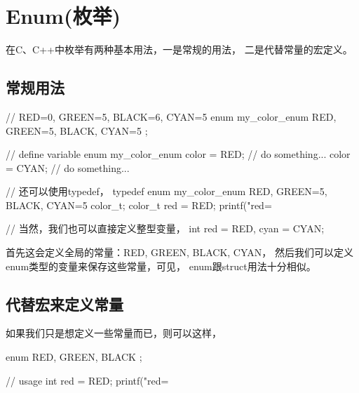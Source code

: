 ﻿\section[Enum]{Enum(枚举)}
在C、C++中枚举有两种基本用法，一是常规的用法，
二是代替常量的宏定义。
\subsection[常规用法]{常规用法}
\begin{cppcode}
// RED=0, GREEN=5, BLACK=6, CYAN=5
enum my_color_enum { RED, GREEN=5, BLACK, CYAN=5 };

// define variable
enum my_color_enum color = RED;
// do something...
color = CYAN;
// do something...

// 还可以使用typedef，
typedef enum my_color_enum {
  RED, GREEN=5, BLACK, CYAN=5
} color_t;
color_t red = RED;
printf("red=%

// 当然，我们也可以直接定义整型变量，
int red = RED, cyan = CYAN;
\end{cppcode}

首先这会定义全局的常量：RED, GREEN, BLACK, CYAN，
然后我们可以定义enum类型的变量来保存这些常量，可见，
enum跟struct用法十分相似。

\subsection[代替宏来定义常量]{代替宏来定义常量}
如果我们只是想定义一些常量而已，则可以这样，

\begin{cppcode}
enum { RED, GREEN, BLACK };

// usage
int red = RED;
printf("red=%
\end{cppcode}